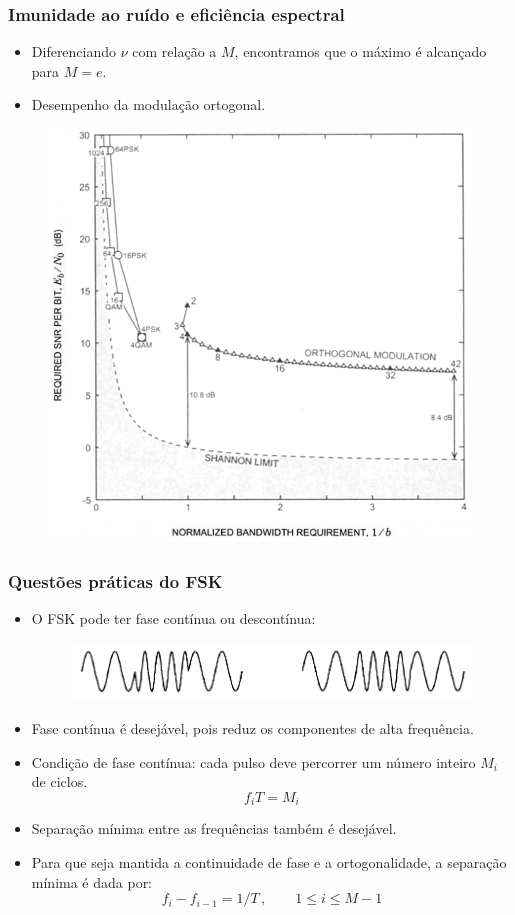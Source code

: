 \begin{frame}
	\frametitle{Imunidade ao ruído e eficiência espectral}

	\begin{itemize}
	    \item Diferenciando $\nu$ com relação a $M$, encontramos que o máximo é alcançado para $M=e$.
	    \item Desempenho da modulação ortogonal.
	\end{itemize}
	\begin{figure}[t]	
	    \begin{center}
	    \includegraphics[width=0.51\columnwidth]{figs/adv_14}
	    \end{center}
	\end{figure}
\end{frame}

\begin{frame}
	\frametitle{Questões práticas do FSK}

	\begin{itemize}
	    \item O FSK pode ter fase contínua ou descontínua:
	    \begin{figure}[t]	
		\begin{center}
		\includegraphics[width=0.65\columnwidth]{figs/adv_15}
		\end{center}
	    \end{figure}
	    \item Fase contínua é desejável, pois reduz os componentes de alta frequência.
	    \item Condição de fase contínua: cada pulso deve percorrer um número inteiro $M_i$ de ciclos.
	    \begin{equation*}
		f_iT = M_i
	    \end{equation*}
	    \item Separação mínima entre as frequências também é desejável.
	    \item Para que seja mantida a continuidade de fase e a ortogonalidade, a separação mínima é dada por:
	    \begin{equation*}
		f_i - f_{i-1} = 1/T \, , \qquad 1 \leq i \leq M-1
	    \end{equation*}
	\end{itemize}	
\end{frame}

